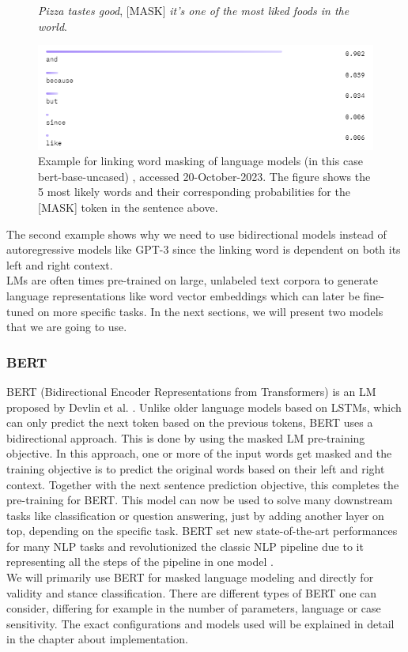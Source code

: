 \begin{figure}[H]
  \begin{center}
	\textit{Pizza tastes good}, [MASK] \textit{it's one of the most liked foods in the world}.
  \end{center}
  \centering
  \includegraphics[scale=0.9]{fig/bert_masking_example2.png}
  \caption{Example for linking word masking of language models (in this case bert-base-uncased) \cite{bertbaseuncased}, accessed 20-October-2023. The figure shows the 5 most likely words and their corresponding probabilities for the [MASK] token in the sentence above.}%
  \label{fig:bert_masking_example2}
\end{figure}

The second example shows why we need to use bidirectional models instead of autoregressive models like GPT-3 since the linking word is dependent on both its left and right context. \\
LMs are often times pre-trained on large, unlabeled text corpora to generate language representations like word vector embeddings which can later be fine-tuned on more specific tasks. In the next sections, we will present two models that we are going to use.


\subsubsection{BERT} \label{sec:bert111}
BERT (Bidirectional Encoder Representations from Transformers) is an LM proposed by Devlin et al. \cite{bert}. Unlike older language models based on LSTMs, which can only predict the next token based on the previous tokens, BERT uses a bidirectional approach. This is done by using the masked LM pre-training objective. In this approach, one or more of the input words get masked and the training objective is to predict the original words based on their left and right context. Together with the next sentence prediction objective, this completes the pre-training for BERT. This model can now be used to solve many downstream tasks like classification or question answering, just by adding another layer on top, depending on the specific task. BERT set new state-of-the-art performances for many NLP tasks and revolutionized the classic NLP pipeline due to it representing all the steps of the pipeline in one model \cite{bertexplain}.  \\
We will primarily use BERT for masked language modeling and directly for validity and stance classification. There are different types of BERT one can consider, differing for example in the number of parameters, language or case sensitivity. The exact configurations and models used will be explained in detail in the chapter about implementation. \\

